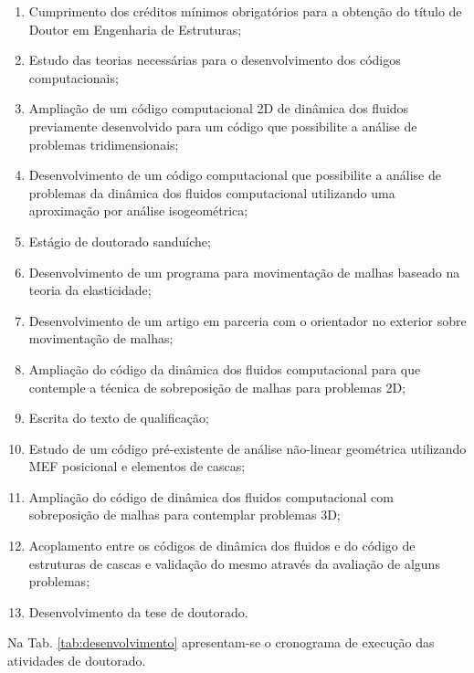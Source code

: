 \documentclass[tese_patricia.tex]{subfiles}
\begin{document}
\begin{enumerate}
	\item Cumprimento dos créditos mínimos obrigatórios para a obtenção do título de Doutor em Engenharia de Estruturas;
	\item Estudo das teorias necessárias para o desenvolvimento dos códigos computacionais;
	\item Ampliação de um código computacional 2D de dinâmica dos fluidos previamente desenvolvido para um código que possibilite a análise de problemas tridimensionais;
	\item Desenvolvimento de um código computacional que possibilite a análise de problemas da dinâmica dos fluidos computacional utilizando uma aproximação por análise isogeométrica;
	\item Estágio de doutorado sanduíche;
	\item Desenvolvimento de um programa para movimentação de malhas baseado na teoria da elasticidade;
	\item Desenvolvimento de um artigo em parceria com o orientador no exterior sobre movimentação de malhas;
	\item Ampliação do código da dinâmica dos fluidos computacional para que contemple a técnica de sobreposição de malhas para problemas 2D;
	\item Escrita do texto de qualificação;
	\item Estudo de um código pré-existente de análise não-linear geométrica utilizando MEF posicional e elementos de cascas;
	\item Ampliação do código de dinâmica dos fluidos computacional com sobreposição de malhas para contemplar problemas 3D;
	\item Acoplamento entre os códigos de dinâmica dos fluidos e do código de estruturas de cascas e validação do mesmo através da avaliação de alguns problemas;
	\item Desenvolvimento da tese de doutorado.
\end{enumerate}

Na Tab. \ref{tab:desenvolvimento} apresentam-se o cronograma de execução das atividades de doutorado.
\end{document}
